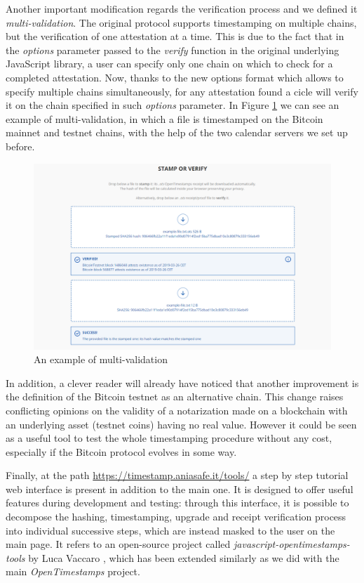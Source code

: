 \bigskip
\noindent
Another important modification regards the verification process and we defined it \textit{multi-validation}. The original protocol supports timestamping on multiple chains, but the verification of one attestation at a time. This is due to the fact that in the \textit{options} parameter passed to the \textit{verify} function in the original underlying JavaScript library, a user can specify only one chain on which to check for a completed attestation. Now, thanks to the new options format which allows to specify multiple chains simultaneously, for any attestation found a cicle will verify it on the chain specified in such \textit{options} parameter. In Figure \ref{fig:multivalidation} we can see an example of multi-validation, in which a file is timestamped on the Bitcoin mainnet and testnet chains, with the help of the two calendar servers we set up before.

\begin{figure}[ht]
    \centering
	\includegraphics[width=1\linewidth]{Images/multivalidation.png}
	\caption{An example of multi-validation}
	\label{fig:multivalidation}
\end{figure}

\bigskip
\noindent
In addition, a clever reader will already have noticed that another improvement is the definition of the Bitcoin testnet as an alternative chain. This change raises conflicting opinions on the validity of a notarization made on a blockchain with an underlying asset (testnet coins) having no real value. However it could be seen as a useful tool to test the whole timestamping procedure without any cost, especially if the Bitcoin protocol evolves in some way.

\bigskip
\noindent
Finally, at the path \url{https://timestamp.aniasafe.it/tools/} a step by step tutorial 
web interface is present in addition to the main one. It is designed to offer useful features during development and testing: through this interface, it is possible to decompose the hashing, timestamping, upgrade and receipt verification process into individual successive steps, which are instead masked to the user on the main page. It refers to an open-source project called \textit{javascript-opentimestamps-tools} by Luca Vaccaro \cite{OTStools}, which has been extended similarly as we did with the main \textit{OpenTimestamps} project.
